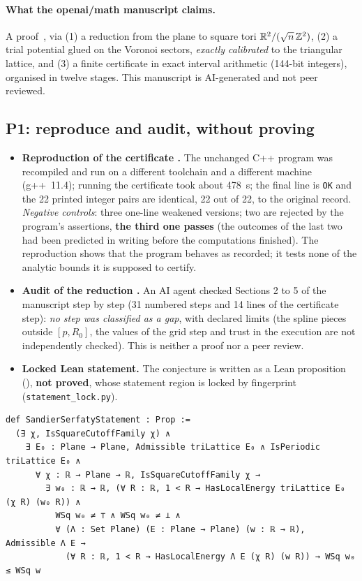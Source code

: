 \paragraph{What the openai/math manuscript claims.} A proof~\cite{ch2oaiss}, via (1) a reduction from the plane to
square tori $\mathbb{R}^2/(\sqrt n\,\mathbb{Z}^2)$, (2) a trial potential glued on the Voronoi sectors, \emph{exactly
calibrated} to the triangular lattice, and (3) a finite certificate in exact interval arithmetic (144-bit integers),
organised in twelve stages. This manuscript is AI-generated and not peer reviewed.

\subsection{P1: reproduce and audit, without proving}\label{ch2:ssec:p1}
\begin{itemize}
\item \textbf{Reproduction of the certificate \tierX.} The unchanged C++ program was recompiled and run on a different
toolchain and a different machine (g++~11.4); running the certificate took about 478~s; the final line is
\texttt{OK} and the 22 printed integer pairs are identical, 22 out of 22, to the original record.
\emph{Negative controls}: three one-line weakened versions; two are rejected by the program's assertions,
\textbf{the third one passes} (the outcomes of the last two had been predicted in writing before the computations
finished). The reproduction shows that the program behaves as recorded; it tests none of the analytic bounds it is
supposed to certify.
\item \textbf{Audit of the reduction \tierC.} An AI agent checked Sections 2 to 5 of the manuscript step by step
(31 numbered steps and 14 lines of the certificate step): \emph{no step was classified as a gap}, with declared
limits (the spline pieces outside $[p,R_0]$, the values of the grid step and trust in the
execution are not independently checked). This is neither a proof nor a peer review.
\item \textbf{Locked Lean statement.} The conjecture is written as a Lean proposition (),
\textbf{not proved}, whose statement region is locked by fingerprint (\texttt{statement\_lock.py}).
\end{itemize}
\begin{leanbox}
\begin{lstlisting}[style=chdeux]
def SandierSerfatyStatement : Prop :=
  (∃ χ, IsSquareCutoffFamily χ) ∧
    ∃ E₀ : Plane → Plane, Admissible triLattice E₀ ∧ IsPeriodic triLattice E₀ ∧
      ∀ χ : ℝ → Plane → ℝ, IsSquareCutoffFamily χ →
        ∃ w₀ : ℝ → ℝ, (∀ R : ℝ, 1 < R → HasLocalEnergy triLattice E₀ (χ R) (w₀ R)) ∧
          WSq w₀ ≠ ⊤ ∧ WSq w₀ ≠ ⊥ ∧
          ∀ (Λ : Set Plane) (E : Plane → Plane) (w : ℝ → ℝ), Admissible Λ E →
            (∀ R : ℝ, 1 < R → HasLocalEnergy Λ E (χ R) (w R)) → WSq w₀ ≤ WSq w
\end{lstlisting}
\end{leanbox}
